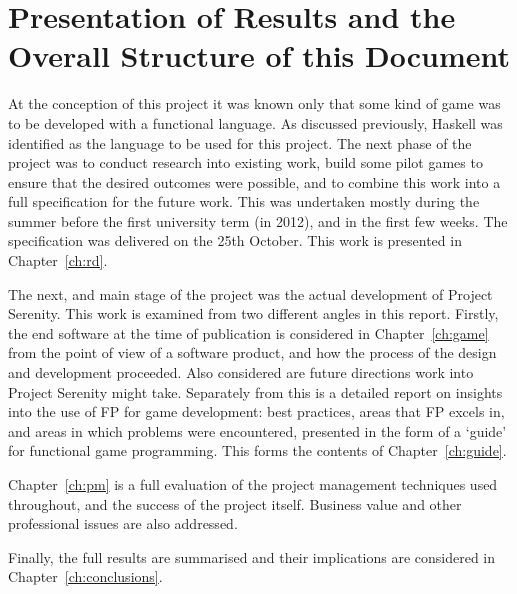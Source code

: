 \section{Presentation of Results and the Overall Structure of this Document}

At the conception of this project it was known only that some kind of game was to be developed with a functional language. As discussed previously, Haskell was identified as the language to be used for this project. The next phase of the project was to conduct research into existing work, build some pilot games to ensure that the desired outcomes were possible, and to combine this work into a full specification for the future work. This was undertaken mostly during the summer before the first university term (in 2012), and in the first few weeks. The specification was delivered on the 25th October. This work is presented in Chapter~\ref{ch:rd}.

The next, and main stage of the project was the actual development of Project Serenity. This work is examined from two different angles in this report. Firstly, the end software at the time of publication is considered in Chapter~\ref{ch:game} from the point of view of a software product, and how the process of the design and development proceeded. Also considered are future directions work into Project Serenity might take. Separately from this is a detailed report on insights into the use of FP for game development: best practices, areas that FP excels in, and areas in which problems were encountered, presented in the form of a `guide' for functional game programming. This forms the contents of Chapter~\ref{ch:guide}.

Chapter~\ref{ch:pm} is a full evaluation of the project management techniques used throughout, and the success of the project itself. Business value and other professional issues are also addressed.

Finally, the full results are summarised and their implications are considered in Chapter~\ref{ch:conclusions}.
